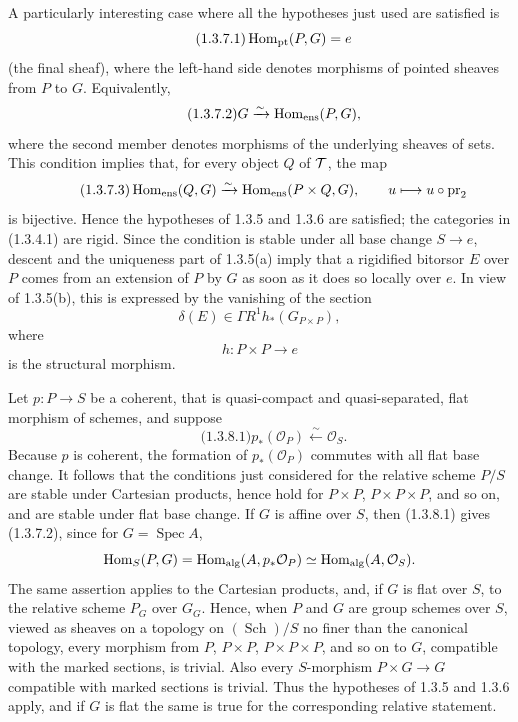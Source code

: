 \documentclass[11pt]{article}
\providecommand{\Spec}{\operatorname{Spec}}
\providecommand{\Sch}{\operatorname{Sch}}
\providecommand{\cO}{\mathcal O}
\providecommand{\pr}{\operatorname{pr}}
\providecommand{\Hom}{\operatorname{Hom}}
\begin{document}
A particularly interesting case where all the hypotheses just used are satisfied is
\begin{equation}\qquad\text{(1.3.7.1)}
  \operatorname{Hom}_{\mathrm{pt}}(P,G)=e
\end{equation}
(the final sheaf), where the left-hand side denotes morphisms of pointed sheaves from \(P\) to \(G\).  Equivalently,
\begin{equation}\qquad\text{(1.3.7.2)}
  G\xrightarrow{\sim}\operatorname{Hom}_{\mathrm{ens}}(P,G),
\end{equation}
where the second member denotes morphisms of the underlying sheaves of sets.  This condition implies that, for every object \(Q\) of \(\mathcal T\), the map
\begin{equation}\qquad\text{(1.3.7.3)}
  \Homens(Q,G)\xrightarrow{\sim}\Homens(P\times Q,G),\qquad
  u\longmapsto u\circ\pr_2
\end{equation}
is bijective.  Hence the hypotheses of 1.3.5 and 1.3.6 are satisfied; the categories in (1.3.4.1) are rigid.  Since the condition is stable under all base change \(S\to e\), descent and the uniqueness part of 1.3.5(a) imply that a rigidified bitorsor \(E\) over \(P\) comes from an extension of \(P\) by \(G\) as soon as it does so locally over \(e\).  In view of 1.3.5(b), this is expressed by the vanishing of the section
\[
  \delta(E)\in\Gamma R^1 h_*(G_{P\times P}),
\]
where
\[
  h:P\times P\to e
\]
is the structural morphism.

Let \(p:P\to S\) be a coherent, that is quasi-compact and quasi-separated, flat morphism of schemes, and suppose
\begin{equation}\qquad\text{(1.3.8.1)}
  p_*(\cO_P)\xleftarrow{\sim}\cO_S.
\end{equation}
Because \(p\) is coherent, the formation of \(p_*(\cO_P)\) commutes with all flat base change.  It follows that the conditions just considered for the relative scheme \(P/S\) are stable under Cartesian products, hence hold for \(P\times P\), \(P\times P\times P\), and so on, and are stable under flat base change.  If \(G\) is affine over \(S\), then (1.3.8.1) gives (1.3.7.2), since for \(G=\Spec A\),
\[
  \Hom_S(P,G)=\Homalg(A,p_*\cO_P)
     \simeq \Homalg(A,\cO_S).
\]
The same assertion applies to the Cartesian products, and, if \(G\) is flat over \(S\), to the relative scheme \(P_G\) over \(G_G\).  Hence, when \(P\) and \(G\) are group schemes over \(S\), viewed as sheaves on a topology on \((\Sch)/S\) no finer than the canonical topology, every morphism from \(P\), \(P\times P\), \(P\times P\times P\), and so on to \(G\), compatible with the marked sections, is trivial.  Also every \(S\)-morphism \(P\times G\to G\) compatible with marked sections is trivial.  Thus the hypotheses of 1.3.5 and 1.3.6 apply, and if \(G\) is flat the same is true for the corresponding relative statement.
\end{document}
